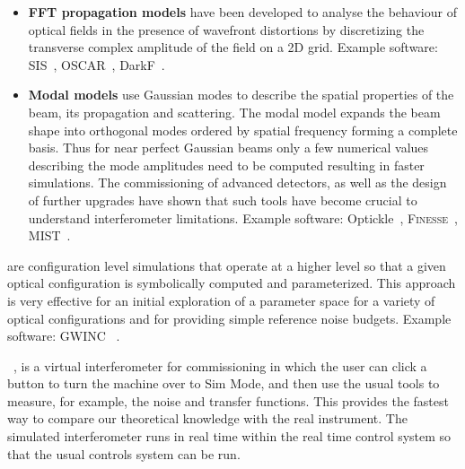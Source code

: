 \begin{itemize}
\item{\textbf{\ac{FFT}   propagation models}} have been developed to analyse the behaviour of optical fields in the presence of wavefront distortions by discretizing the transverse complex amplitude of the field on a 2D grid.
Example software: SIS~\cite{SIS}, \acs{OSCAR}~\cite{OSCAR}, \acs{DarkF}~\cite{DarkF, Vinet92}.
 
\item{\textbf{Modal models}} use Gaussian modes to describe the spatial properties of the beam, its propagation and scattering. The modal model expands the beam shape into orthogonal modes ordered by spatial frequency forming a complete basis. Thus for near perfect Gaussian beams only a few numerical values describing the mode amplitudes need to be computed resulting in faster simulations. The commissioning of advanced detectors, as well as the design of further upgrades have shown that such tools have become crucial to understand interferometer limitations. 
Example software: \acs{Optickle}~\cite{Optickle}, \textsc{\acs{Finesse}}~\cite{Finesse, Freise04}, \acs{MIST}~\cite{MIST}.
\end{itemize}
 are configuration level simulations that operate at a higher level so that a given optical configuration is symbolically computed and parameterized. 
This approach is very effective for an initial exploration of a parameter space for a variety of optical configurations and for providing simple reference noise budgets. Example software: \ac{GWINC}  ~\cite{GWINC}.

~\cite{simplant}, is a virtual interferometer for commissioning in which the user can click a button to turn the machine over to Sim Mode, and then use the usual tools to measure, for example, the noise and transfer functions. This provides the fastest way to compare our theoretical knowledge with the real instrument.
The simulated interferometer runs in real time within the real time control system so that the usual controls system can be run. 

